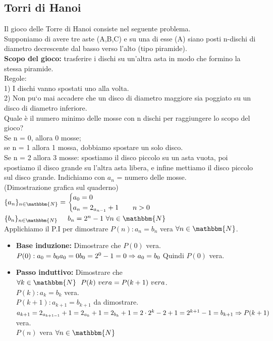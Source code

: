 \documentclass[12pt, letterpaper]{report}
\begin{document}
 		\subsection{Torri di Hanoi}
 		Il gioco delle Torre di Hanoi consiste nel seguente problema. \\ Supponiamo di avere tre aste (A,B,C) e su una di esse
 		(A) siano posti n-dischi di diametro decrescente dal basso verso l’alto (tipo piramide). \\
 		\textbf{Scopo del gioco:} trasferire i dischi su un’altra asta in modo che formino la stessa piramide. \\
 		Regole: \\
 		1) I dischi vanno spostati uno alla volta. \\
 		2) Non pu`o mai accadere che un disco di diametro maggiore sia poggiato su un disco di diametro inferiore. \\
 		Quale è il numero minimo delle mosse con n dischi per raggiungere lo scopo del gioco? \\
 		Se n = 0, allora 0 mosse;\\
 		se n = 1 allora 1 mossa, dobbiamo spostare un solo disco. \\
 		Se n = 2 allora 3 mosse: spostiamo il disco piccolo su un asta vuota, poi spostiamo il disco grande su l’altra asta libera, e infine mettiamo il disco piccolo sul disco grande.
 		Indichiamo con $a_n$ = numero delle mosse. \\
 		(Dimostrazione grafica sul quaderno) \\
 		$\{a_n\}_{n \in \mathbbm{N}} = \begin{cases}
 			a_0 = 0 \\
 			a_n = 2_{a_{n - 1}} + 1 \hspace{0.7cm} n > 0
 		\end{cases}$
 		\\
 		$\{b_n\}_{n \in \mathbbm{N}} \hspace{0.5cm} b_n = 2^n - 1 \ \forall n \in \mathbbm{N}$ \\
 		Applichiamo il P.I per dimostrare $P(n): a_n = b_n$ vera $\forall n \in \mathbbm{N}$.
 		\begin{itemize}
 			\item \textbf{Base induzione:} Dimostrare che $P(0)$ vera. \\
 			$P(0): a_0 = b_0 \\ a_0 = 0 \\ b_0 = 2^0 - 1 = 0 \\ \Rightarrow a_0=b_0$ Quindi $P(0)$ vera.
 			\item \textbf{Passo induttivo:} Dimostrare che $\forall k \in \mathbbm{N} \ \ P(k) \ vera = P(k + 1) \ vera$. \\
 			$P(k): a_k = b_k$ vera. \\
 			$P(k + 1): a_{k + 1} = b_{k + 1}$ da dimostrare.
 			\\
 			$a_{k + 1} = 2_{a_{k + 1 - 1}} + 1 = 2_{a_k} + 1 = 2_{b_k} + 1 = 2 \cdot 2^k - 2 + 1 = 2^{k + 1} - 1 = b_{k + 1}\\ \Rightarrow P(k + 1)$ vera. \\
 			$P(n)$ vera $\forall n \in \mathbbm{N}$
 		\end{itemize}
\end{document}
